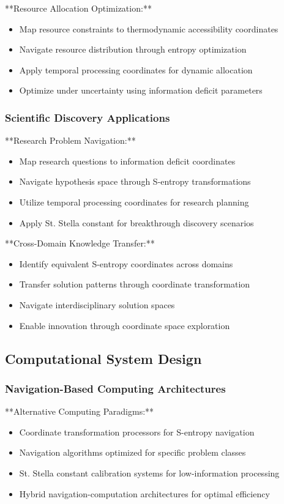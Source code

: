\documentclass[11pt]{article}
\begin{document}
**Resource Allocation Optimization:**
\begin{itemize}
\item Map resource constraints to thermodynamic accessibility coordinates
\item Navigate resource distribution through entropy optimization
\item Apply temporal processing coordinates for dynamic allocation
\item Optimize under uncertainty using information deficit parameters
\end{itemize}

\subsubsection{Scientific Discovery Applications}

**Research Problem Navigation:**
\begin{itemize}
\item Map research questions to information deficit coordinates
\item Navigate hypothesis space through S-entropy transformations
\item Utilize temporal processing coordinates for research planning
\item Apply St. Stella constant for breakthrough discovery scenarios
\end{itemize}

**Cross-Domain Knowledge Transfer:**
\begin{itemize}
\item Identify equivalent S-entropy coordinates across domains
\item Transfer solution patterns through coordinate transformation
\item Navigate interdisciplinary solution spaces
\item Enable innovation through coordinate space exploration
\end{itemize}

\subsection{Computational System Design}

\subsubsection{Navigation-Based Computing Architectures}

**Alternative Computing Paradigms:**
\begin{itemize}
\item Coordinate transformation processors for S-entropy navigation
\item Navigation algorithms optimized for specific problem classes
\item St. Stella constant calibration systems for low-information processing
\item Hybrid navigation-computation architectures for optimal efficiency
\end{itemize}
\end{document}

